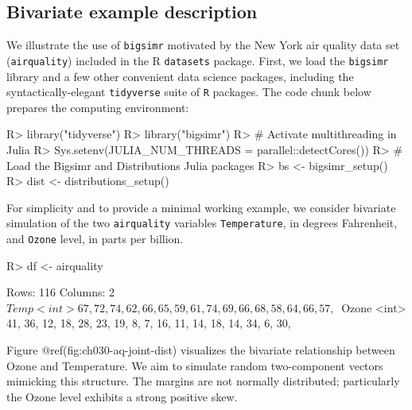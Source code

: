 \documentclass[
]{jss}
\begin{document}
\hypertarget{bivariate-example-description}{%
\subsection{Bivariate example
description}\label{bivariate-example-description}}

We illustrate the use of \texttt{bigsimr} motivated by the New York air
quality data set (\texttt{airquality}) included in the R
\texttt{datasets} package. First, we load the \texttt{bigsimr} library
and a few other convenient data science packages, including the
syntactically-elegant \texttt{tidyverse} suite of \texttt{R} packages.
The code chunk below prepares the computing environment:

\begin{CodeChunk}
\begin{CodeInput}
R> library("tidyverse")
R> library("bigsimr")
R> # Activate multithreading in Julia
R> Sys.setenv(JULIA_NUM_THREADS = parallel::detectCores())
R> # Load the Bigsimr and Distributions Julia packages
R> bs <- bigsimr_setup()
R> dist <- distributions_setup()
\end{CodeInput}
\end{CodeChunk}

For simplicity and to provide a minimal working example, we consider
bivariate simulation of the two \texttt{airquality} variables
\texttt{Temperature}, in degrees Fahrenheit, and \texttt{Ozone} level,
in parts per billion.

\begin{CodeChunk}
\begin{CodeInput}
R> df <- airquality %
\end{CodeInput}
\end{CodeChunk}

\begin{CodeChunk}
\begin{CodeOutput}
Rows: 116
Columns: 2
$ Temp  <int> 67, 72, 74, 62, 66, 65, 59, 61, 74, 69, 66, 68, 58, 64, 66, 57, ~
$ Ozone <int> 41, 36, 12, 18, 28, 23, 19, 8, 7, 16, 11, 14, 18, 14, 34, 6, 30,~
\end{CodeOutput}
\end{CodeChunk}

Figure @ref(fig:ch030-aq-joint-dist) visualizes the bivariate
relationship between Ozone and Temperature. We aim to simulate random
two-component vectors mimicking this structure. The margins are not
normally distributed; particularly the Ozone level exhibits a strong
positive skew.
\end{document}
